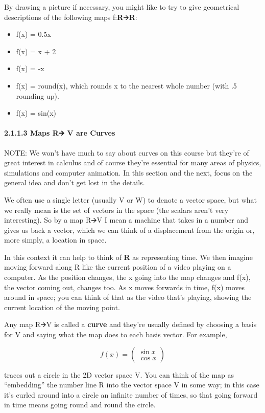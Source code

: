 \documentclass[oneside,english]{amsbook}
\numberwithin{section}{chapter}
\theoremstyle{plain}
\theoremstyle{definition}
\begin{document}
By drawing a picture if necessary, you might like to try to give
geometrical descriptions of the following maps f:\textbf{R}🡪\textbf{R}:

\begin{itemize}
	\item
	f(x) = 0.5x
	\item
	f(x) = x + 2
	\item
	f(x) = -x
	\item
	f(x) = round(x), which rounds x to the nearest whole number (with .5
	rounding up).
	\item
	f(x) = sin(x)
\end{itemize}

\paragraph{2.1.1.3 Maps R🡪 V are Curves}\label{maps-r-v-are-curves}

NOTE: We won't have much to say about curves on this course but they're
of great interest in calculus and of course they're essential for many
areas of physics, simulations and computer animation. In this section
and the next, focus on the general idea and don't get lost in the
details.

We often use a single letter (usually V or W) to denote a vector space,
but what we really mean is the set of vectors in the space (the scalars
aren't very interesting). So by a map R🡪V I mean a machine that takes in
a number and gives us back a vector, which we can think of a
displacement from the origin or, more simply, a location in space.

In this context it can help to think of \textbf{R} as representing time.
We then imagine moving forward along R like the current position of a
video playing on a computer. As the position changes, the x going into
the map changes and f(x), the vector coming out, changes too. As x moves
forwards in time, f(x) moves around in space; you can think of that as
the video that's playing, showing the current location of the moving
point.

Any map R🡪V is called a \textbf{curve} and they're usually defined by
choosing a basis for V and saying what the map does to each basis
vector. For example,

\[f(x) = \begin{pmatrix}
	\sin x \\
	\cos x
\end{pmatrix}\]

traces out a circle in the 2D vector space V. You can think of the map
as ``embedding'' the number line R into the vector space V in some way;
in this case it's curled around into a circle an infinite number of
times, so that going forward in time means going round and round the
circle.
\end{document}
